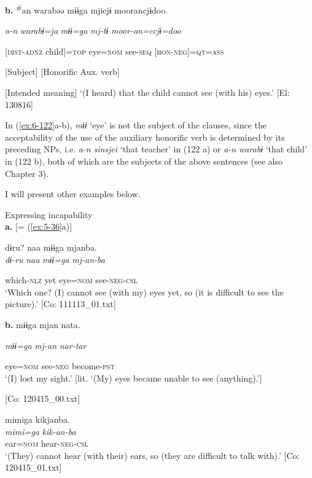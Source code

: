 \begin{table}
\begin{styleBeschriftung}
  \textbf{b.}  {\TM}  \textsuperscript{\#}an  warabəə  mɨɨga  mjicjɨ  moorancjɨdoo.

       \textit{a-n}  \textit{warabɨ=ja}  \textit{mɨɨ=ga}  \textit{mj-tɨ}  \textit{moor-an=ccjɨ=doo}

      [\textsc{dist}-\textsc{adnz}  child]=\textsc{top}  eye=\textsc{nom}  see-\textsc{seq}  [\textsc{hon}-\textsc{neg}]=\textsc{qt}=\textsc{ass}

      [Subject]      [Honorific Aux. verb]

      [Intended meaning] ‘(I heard) that the child cannot see (with his) eyes.’ [El: 130816]

In (\ref{ex:6-122}a-b), \textit{mɨɨ} ‘eye’ is not the subject of the clauses, since the acceptability of the use of the auxiliary honorific verb is determined by its preceding NPs, i.e. \textit{a-n} \textit{sinsjei} ‘that teacher’ in (122 a) or \textit{a-n} \textit{warabɨ} ‘that child’ in (122 b), both of which are the subjects of the above sentences (see also Chapter 3).

  I will present other examples below.

\ea\label{ex:6-123}
 Expressing incapability\\

  \textbf{a.}  [= (\ref{ex:5-36}a)]

{\TM}
\glll dɨru?  naa  mɨɨga  mjanba.\\

      \textit{dɨ-ru}  \textit{naa}  \textit{mɨɨ=ga}  \textit{mj-an-ba}

      which-\textsc{nlz}  yet  eye=\textsc{nom}  see-\textsc{neg}-\textsc{csl}\\
\glt ‘Which one? (I) cannot see (with my) eyes yet, so (it is difficult to see the picture).’ [Co: 111113\_01.txt]
\z

  \textbf{b.}  {\TM}  mɨɨga  mjan  nata.

      \textit{mɨɨ=ga}  \textit{mj-an}  \textit{nar-tar}

      eye=\textsc{nom}  see-\textsc{neg}  become-\textsc{pst}\\
\glt ‘(I) lost my sight.’ [lit. ‘(My) eyes became unable to see (anything).’]

      [Co: 120415\_00.txt]
\z

\ex {\TM}  mimiga  kikjanba.\\
\glll \textit{mimi=ga}  \textit{kik-an-ba}\\
ear=\textsc{nom}  hear-\textsc{neg}-\textsc{csl}\\
\glt ‘(They) cannot hear (with their) ears, so (they are difficult to talk with).’ [Co: 120415\_01.txt]
\z


\end{styleBeschriftung}
\end{table}
